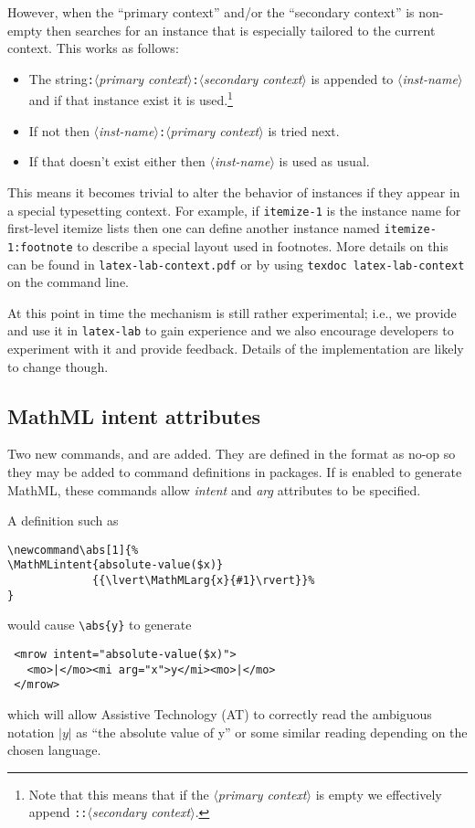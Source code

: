 \documentclass{ltnews}
\providecommand\meta[1]{$\langle$\textrm{\itshape#1}$\rangle$}
\begin{document}
However, when the \enquote{primary context} and/or the
\enquote{secondary context} is non-empty then 
searches for an instance that is especially tailored to the current
context.  This works as follows:
\begin{itemize}
\item The string\texttt{:}\meta{primary
  context}\texttt{:}\meta{secondary context} is appended to
  \meta{inst-name} and if that instance exist it is
  used.\footnote{Note that this means that if the \meta{primary
    context} is empty we effectively append \texttt{::}\meta{secondary
    context}.}
\item
  If not then \meta{inst-name}\texttt{:}\meta{primary context} is
  tried next.
\item
  If that doesn't exist either then \meta{inst-name} is used as usual.
\end{itemize}
% 
This means it becomes trivial to alter the behavior of instances if
they appear in a special typesetting context. For example, if
\texttt{itemize-1} is the instance name for first-level itemize lists
then one can define another instance named \texttt{itemize-1:footnote}
to describe a special layout used in footnotes.  More details on this
can be found in \texttt{latex-lab-context.pdf} or by using
\verb*=texdoc latex-lab-context= on the command line.

At this point in time the mechanism is still rather experimental;
i.e., we provide and use it in \texttt{latex-lab} to gain experience
and we also encourage developers to experiment with it and provide
feedback. Details of the implementation are likely to change though.




\subsection{MathML intent attributes}

Two new commands,  and  are added. They
are defined in the format as no-op so they may be added to command
definitions in packages.  If  is enabled to generate
MathML, these commands allow \emph{intent} and \emph{arg} attributes
to be specified.

A  definition such as
\begin{verbatim}
\newcommand\abs[1]{%
\MathMLintent{absolute-value($x)}
             {{\lvert\MathMLarg{x}{#1}\rvert}}%
}
\end{verbatim}
would cause \verb|\abs{y}| to generate
\begin{verbatim}
 <mrow intent="absolute-value($x)">
   <mo>|</mo><mi arg="x">y</mi><mo>|</mo>
 </mrow>
\end{verbatim}
which will allow Assistive Technology (AT) to correctly read the
ambiguous notation $|y|$ as \enquote{the absolute value of y} or some
similar reading depending on the chosen language.
\end{document}
